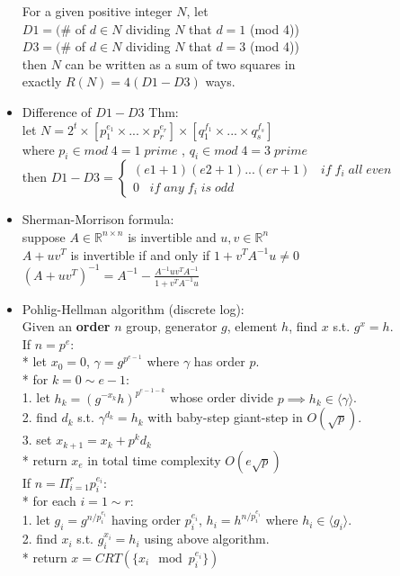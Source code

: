 \begin{itemize}[leftmargin=*]
  For a given positive integer $N$, let\\
  $D1 = (\#$ of $d \in N$ dividing $N$ that $d=1$ (mod 4))\\
  $D3 = (\#$ of $d \in N$ dividing $N$ that $d=3$ (mod 4))\\
  then $N$ can be written as a sum of two squares in\\
  exactly $R(N) = 4(D1-D3)$ ways.
\item Difference of $D1-D3$ Thm:\\
  let $N=2^t \times [p_1^{e_1} \times ...\times p_r^{e_r}] \times [q_1^{f_1} \times ...\times q_s^{f_s}]$\\
  where $p_i \in mod\;4 = 1\;prime$ , $q_i \in mod\;4 = 3\;prime$\\
  then $D1 - D3 = \begin{cases}(e1+1)(e2+1)...(er+1)\;\;\;if\;f_i\;all\;even\\0\;\;\;if\;any\;f_i\;is\;odd\end{cases}$
\item Sherman-Morrison formula:\\
  suppose $A \in \mathbb{R}^{n\times n}$ is invertible and $u,v \in \mathbb{R}^n$\\
  $A + uv^T$ is invertible if and only if $1 + v^TA^{-1}u \ne 0$\\
  $(A + uv^T)^{-1} = A^{-1} - \frac{A^{-1}uv^TA^{-1}}{1+v^TA^{-1}u}$\\
\item Pohlig-Hellman algorithm (discrete log):\\
  Given an \textbf{order} $n$ group, generator $g$, element $h$, find $x$ s.t. $g^x=h$.\\
  If $n=p^e$:\\
    * let $x_0=0$, $\gamma=g^{p^{e-1}}$ where $\gamma$ has order $p$.\\
    * for $k=0\sim e-1$:\\
    1. let $h_k=(g^{-x_k}h)^{p^{e-1-k}}$ whose order divide $p\implies h_k\in \langle\gamma\rangle$.\\
    2. find $d_k$ s.t. $\gamma^{d_k}=h_k$ with baby-step giant-step in $O(\sqrt p)$.\\
    3. set $x_{k+1}=x_k+p^kd_k$\\
    * return $x_e$ in total time complexity $O(e\sqrt p)$\\
  If $n=\Pi_{i=1}^{r}p_i^{e_i}$:\\
    * for each $i=1\sim r$:\\
    1. let $g_i=g^{n/p_i^{e_i}}$ having order $p_i^{e_i}$, $h_i=h^{n/p_i^{e_i}}$ where $h_i\in\langle g_i\rangle$.\\
    2. find $x_i$ s.t. $g_i^{x_i}=h_i$ using above algorithm.\\
    * return $x=CRT(\{x_i\mod p_i^{e_i}\})$
\end{itemize}
